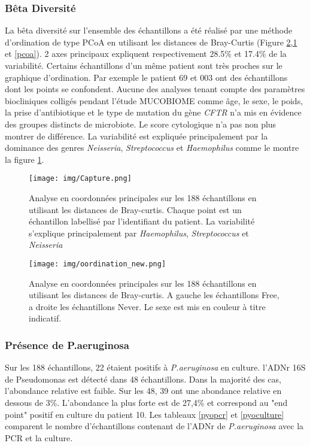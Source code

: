 \documentclass[12pt,a4paper]{article}
\begin{document}
\subsubsection{Bêta Diversité}
La bêta diversité sur l’ensemble des échantillons a été réalisé par une méthode d’ordination de type PCoA en utilisant les distances de Bray-Curtis (Figure \ref{ordination},\ref{ordination2} et \ref{pcoa}).
2 axes principaux expliquent respectivement 28.5\% et 17.4\% de la variabilité.
Certains échantillons d’un même patient sont très proches sur le graphique d’ordination. Par exemple le patient 69 et 003 ont des échantillons dont les points se confondent.
Aucune des analyses tenant compte des paramètres biocliniques colligés pendant l'étude MUCOBIOME comme âge, le sexe, le poids, la prise d'antibiotique et le type de mutation du gène \textit{CFTR} n’a mis en évidence des groupes distincts de microbiote. Le score cytologique n'a pas non plus montrer de différence.
La variabilité est expliquée principalement par la dominance des genres \textit{Neisseria}, \textit{Streptococcus} et \textit{Haemophilus} comme le montre la figure \ref{ordination2}.


\begin{figure}
\begin{center}
\texttt{[image: img/Capture.png]}\hfill
\end{center}
\caption{Analyse en coordonnées principales sur les 188 échantillons en utilisant les distances de Bray-curtis. Chaque point est un échantillon labellisé par l'identifiant du patient. La variabilité s'explique principalement par \textit{Haemophilus}, \textit{Streptococcus} et \textit{Neisseria}}
\label{ordination2}
\end{figure}


\begin{figure}
\begin{center}
\texttt{[image: img/oordination\_new.png]}\hfill
\end{center}
\caption{Analyse en coordonnées principales sur les 188 échantillons en utilisant les distances de Bray-curtis. A gauche les échantillons Free, a droite les échantillons Never. Le sexe est mis en couleur à titre indicatif.}
\label{ordination}
\end{figure}

\subsubsection{Présence de P.aeruginosa}
Sur les 188 échantillons, 22 étaient positifs à \textit{P.aeruginosa} en culture.  l'ADNr 16S de Pseudomonas est détecté dans 48 échantillons. Dans la majorité des cas, l'abondance relative est faible. Sur les 48, 39 ont une abondance relative en dessous de 3\%. L'abondance la plus forte est de 27,4\% et correspond au "end point" positif en culture du patient 10.
Les tableaux \ref{pyopcr} et \ref{pyoculture} comparent le nombre d'échantillons contenant de l'ADNr de \textit{P.aeruginosa} avec la PCR et la culture.
\end{document}
